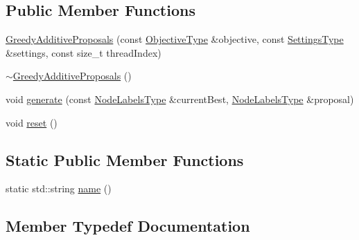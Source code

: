 \subsection*{Public Member Functions}
\begin{DoxyCompactItemize}
\item 
\hyperlink{classnifty_1_1graph_1_1opt_1_1multicut_1_1GreedyAdditiveProposals_acfd468728e9728e3e4430431f1b4aea8}{Greedy\+Additive\+Proposals} (const \hyperlink{classnifty_1_1graph_1_1opt_1_1multicut_1_1GreedyAdditiveProposals_a8b28464e490d224a3626680692ac2170}{Objective\+Type} \&objective, const \hyperlink{structnifty_1_1graph_1_1opt_1_1multicut_1_1GreedyAdditiveProposals_1_1SettingsType}{Settings\+Type} \&settings, const size\+\_\+t thread\+Index)
\item 
\hyperlink{classnifty_1_1graph_1_1opt_1_1multicut_1_1GreedyAdditiveProposals_a182df5d93866be9a4d6f19f6c6de92c9}{$\sim$\+Greedy\+Additive\+Proposals} ()
\item 
void \hyperlink{classnifty_1_1graph_1_1opt_1_1multicut_1_1GreedyAdditiveProposals_a084ca7ba230e26884a2ecbb694415df6}{generate} (const \hyperlink{classnifty_1_1graph_1_1opt_1_1multicut_1_1GreedyAdditiveProposals_a4097016ca99d6d2aab8f3a8a9432f001}{Node\+Labels\+Type} \&current\+Best, \hyperlink{classnifty_1_1graph_1_1opt_1_1multicut_1_1GreedyAdditiveProposals_a4097016ca99d6d2aab8f3a8a9432f001}{Node\+Labels\+Type} \&proposal)
\item 
void \hyperlink{classnifty_1_1graph_1_1opt_1_1multicut_1_1GreedyAdditiveProposals_a039d407722e0ad11b70e420787d89f2b}{reset} ()
\end{DoxyCompactItemize}
\subsection*{Static Public Member Functions}
\begin{DoxyCompactItemize}
\item 
static std\+::string \hyperlink{classnifty_1_1graph_1_1opt_1_1multicut_1_1GreedyAdditiveProposals_aa01754a86f77c4637a4c8497ff1d4cbd}{name} ()
\end{DoxyCompactItemize}


\subsection{Member Typedef Documentation}
\mbox{\label{classnifty_1_1graph_1_1opt_1_1multicut_1_1GreedyAdditiveProposals_a058a440d88f840a245fdc792d47611d5}} 

